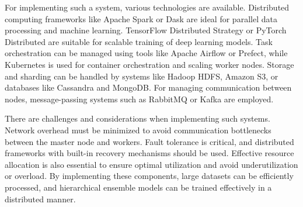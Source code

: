 \noindent
For implementing such a system, various technologies are available. Distributed computing frameworks like Apache Spark or Dask are ideal for parallel data processing and machine learning. TensorFlow Distributed Strategy or PyTorch Distributed are suitable for scalable training of deep learning models. Task orchestration can be managed using tools like Apache Airflow or Prefect, while Kubernetes is used for container orchestration and scaling worker nodes. Storage and sharding can be handled by systems like Hadoop HDFS, Amazon S3, or databases like Cassandra and MongoDB. For managing communication between nodes, message-passing systems such as RabbitMQ or Kafka are employed.

\vspace{1em}

\noindent
There are challenges and considerations when implementing such systems. Network overhead must be minimized to avoid communication bottlenecks between the master node and workers. Fault tolerance is critical, and distributed frameworks with built-in recovery mechanisms should be used. Effective resource allocation is also essential to ensure optimal utilization and avoid underutilization or overload. By implementing these components, large datasets can be efficiently processed, and hierarchical ensemble models can be trained effectively in a distributed manner.

\pagebreak
